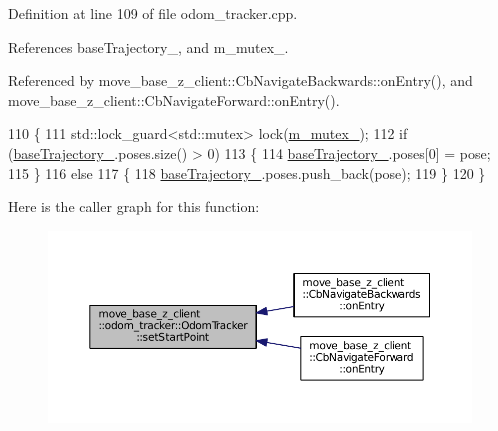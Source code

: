 Definition at line 109 of file odom\+\_\+tracker.\+cpp.



References base\+Trajectory\+\_\+, and m\+\_\+mutex\+\_\+.



Referenced by move\+\_\+base\+\_\+z\+\_\+client\+::\+Cb\+Navigate\+Backwards\+::on\+Entry(), and move\+\_\+base\+\_\+z\+\_\+client\+::\+Cb\+Navigate\+Forward\+::on\+Entry().


\begin{DoxyCode}
110 \{
111     std::lock\_guard<std::mutex> lock(\hyperlink{classmove__base__z__client_1_1odom__tracker_1_1OdomTracker_a63676e03be48b18ac48d5e2f11f19a25}{m\_mutex\_});
112     \textcolor{keywordflow}{if} (\hyperlink{classmove__base__z__client_1_1odom__tracker_1_1OdomTracker_a83fa5a9bfe0b2683eee33444d3f030ea}{baseTrajectory\_}.poses.size() > 0)
113     \{
114         \hyperlink{classmove__base__z__client_1_1odom__tracker_1_1OdomTracker_a83fa5a9bfe0b2683eee33444d3f030ea}{baseTrajectory\_}.poses[0] = pose;
115     \}
116     \textcolor{keywordflow}{else}
117     \{
118         \hyperlink{classmove__base__z__client_1_1odom__tracker_1_1OdomTracker_a83fa5a9bfe0b2683eee33444d3f030ea}{baseTrajectory\_}.poses.push\_back(pose);
119     \}
120 \}
\end{DoxyCode}


Here is the caller graph for this function\+:
\nopagebreak
\begin{figure}[H]
\begin{center}
\leavevmode
\includegraphics[width=350pt]{classmove__base__z__client_1_1odom__tracker_1_1OdomTracker_afa402777496c8d0df39191f40377bd0e_icgraph}
\end{center}
\end{figure}


